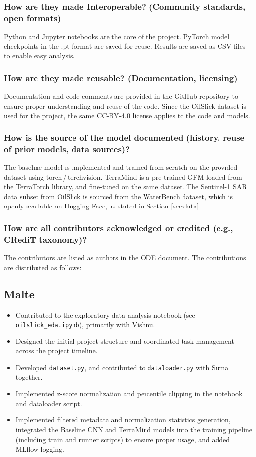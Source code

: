 \documentclass[sigconf]{acmart}
\begin{document}
\subsubsection{How are they made Interoperable? (Community standards, open formats)} Python and Jupyter notebooks are the core of the project. PyTorch model checkpoints in the .pt format are saved for reuse. Results are saved as CSV files to enable easy analysis.
\subsubsection{How are they made reusable? (Documentation, licensing)}  Documentation and code comments are provided in the GitHub repository to ensure proper understanding and reuse of the code. Since the OilSlick dataset is used for the project, the same CC-BY-4.0 license applies to the code and models.
\subsubsection{How is the source of the model documented (history, reuse of prior models, data sources)?} The baseline model is implemented and trained from scratch on the provided dataset using torch\,/\,torchvision. TerraMind is a pre-trained GFM loaded from the TerraTorch library, and fine-tuned on the same dataset. The Sentinel-1 SAR data subset from OilSlick is sourced from the WaterBench dataset, which is openly available on Hugging Face, as stated in Section \ref{sec:data}.
\subsubsection{How are all contributors acknowledged or credited (e.g., CRediT taxonomy)?} The contributors are listed as authors in the ODE document. The contributions are distributed as follows:\subsection*{Malte}
\begin{itemize}
    \item Contributed to the exploratory data analysis notebook (see \texttt{oilslick\_eda.ipynb}), primarily with Vishnu.
    \item Designed the initial project structure and coordinated task management across the project timeline.
    \item Developed \texttt{dataset.py}, and contributed to \texttt{dataloader.py} with Suma together.
    \item Implemented z-score normalization and percentile clipping in the notebook and dataloader script.
    \item Implemented filtered metadata and normalization statistics generation, integrated the Baseline CNN and TerraMind models into the training pipeline (including train and runner scripts) to ensure proper usage, and added MLflow logging.
\end{itemize}
\end{document}
